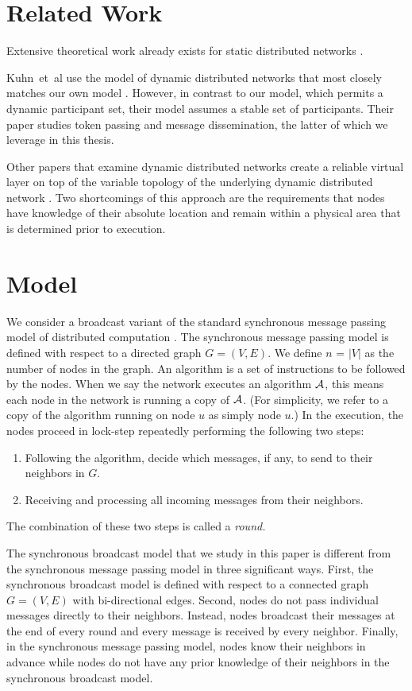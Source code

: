\documentclass[english]{article}
\begin{document}
\section{Related Work}

Extensive theoretical work already exists for static distributed networks \cite{Schneider:1990}.

Kuhn~et~al use the model of dynamic distributed networks that most closely matches our own model \cite{Kuhn:2008}. However, in contrast to our model, which permits a dynamic participant set, their model assumes a stable set of participants. Their paper studies token passing and message dissemination, the latter of which we leverage in this thesis. 

Other papers that examine dynamic distributed networks create a reliable virtual layer on top of the variable topology of the underlying dynamic distributed network \cite{Brown:2007, Chockler:2008, Gao:2012}. Two shortcomings of this approach are the requirements that nodes have knowledge of their absolute location and remain within a physical area that is determined prior to execution.


\section{Model}


We consider a broadcast variant of the standard synchronous message passing model of distributed computation \cite{Lynch:1996, Kuhn:2010}. The synchronous message passing model is defined with respect to a directed graph $G=(V,E)$. We define $n$ = $|V|$ as the number of nodes in the graph. An algorithm is a set of instructions to be followed by the nodes. When we say the network executes an algorithm $\cal A$, this means each node in the network is running a copy of $\cal A$. (For simplicity, we refer to a copy of the algorithm running on node $u$ as simply node $u$.) In the execution, the nodes proceed in lock-step repeatedly performing the following two steps:
\begin{enumerate}
  \item Following the algorithm, decide which messages, if any, to send to their neighbors in $G$.
  \item Receiving and processing all incoming messages from their neighbors.
\end{enumerate}
The combination of these two steps is called a \em round\em.

The synchronous broadcast model that we study in this paper is different from the synchronous message passing model in three significant ways. First, the synchronous broadcast model is defined with respect to a connected graph $G=(V,E)$ with bi-directional edges. Second, nodes do not pass individual messages directly to their neighbors. Instead, nodes broadcast their messages at the end of every round and every message is received by every neighbor. Finally, in the synchronous message passing model, nodes know their neighbors in advance while nodes do not have any prior knowledge of their neighbors in the synchronous broadcast model.
\end{document}
